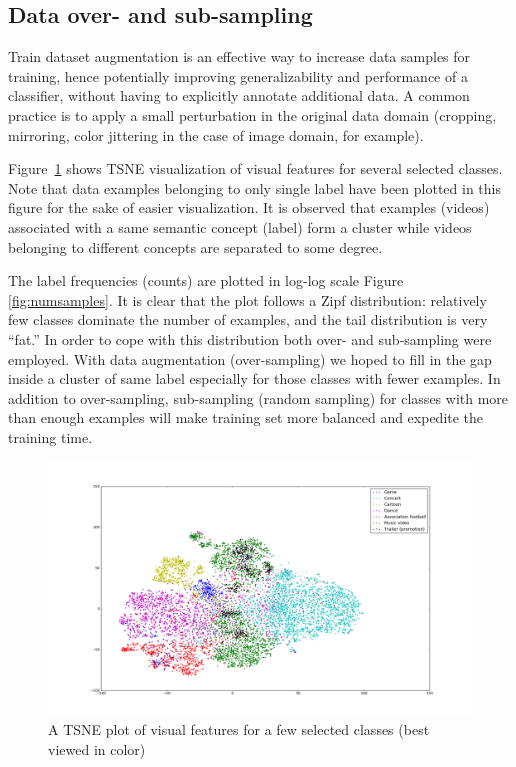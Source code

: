 \documentclass[runningheads]{llncs}
\begin{document}
\subsection{Data over- and sub-sampling} \label{sub:augmentation}
Train dataset augmentation is an effective way to increase data samples for training, hence potentially improving generalizability and performance of a classifier, without having to explicitly annotate additional data.
A common practice is to apply a small perturbation in the original data domain (cropping, mirroring, color jittering in the case of image domain, for example).

Figure~\ref{fig:tsne} shows TSNE visualization of visual features for several selected classes.
Note that data examples belonging to only single label have been plotted in this figure for the sake of easier visualization.
It is observed that examples (videos) associated with a same semantic concept (label) form a cluster while videos belonging to different concepts are separated to some degree.

The label frequencies (counts) are plotted in log-log scale Figure \ref{fig:numsamples}.
It is clear that the plot follows a Zipf distribution: relatively few classes dominate the number of examples, and the tail distribution is very ``fat.''
In order to cope with this distribution both over- and sub-sampling were employed.
With data augmentation (over-sampling) we hoped to fill in the gap inside a cluster of same label especially for those classes with fewer examples.
In addition to over-sampling, sub-sampling (random sampling) for classes with more than enough examples will make training set more balanced and expedite the training time.

\begin{figure}
  \includegraphics[width=\linewidth]{./figures/tsne-vfeat-large2.png}
  \caption{A TSNE plot of visual features for a few selected classes (best viewed in color)}
  \label{fig:tsne}
\end{figure}
\end{document}
